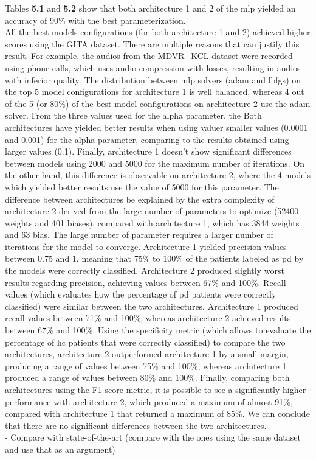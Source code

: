 Tables \textbf{5.1} and \textbf{5.2} show that both architecture 1 and 2 of the \gls{mlp} yielded an accuracy of 90\% with the best parameterization. \\
All the best models configurations (for both architecture 1 and 2) achieved higher scores using the GITA dataset. There are multiple reasons that can justify this result. For example, the audios from the MDVR\_KCL dataset were recorded using phone calls, which uses audio compression with losses, resulting in audios with inferior quality. The distribution between \gls{mlp} solvers (adam and lbfgs) on the top 5 model configurations for architecture 1 is well balanced, whereas 4 out of the 5 (or 80\%) of the best model configurations on architecture 2 use the adam solver. From the three values used for the alpha parameter, the Both architectures have yielded better results when using valuer smaller values (0.0001 and 0.001) for the alpha parameter, comparing to the results obtained using larger values (0.1). Finally, architecture 1 doesn't show significant differences between models using 2000 and 5000 for the maximum number of iterations. On the other hand, this difference is observable on architecture 2, where the 4 models which yielded better results use the value of 5000 for this parameter. The difference between architectures be explained by the extra complexity of architecture 2 derived from the large number of parameters to optimize (52400 weights and 401 biases), compared with architecture 1, which has 3844 weights and 63 bias. The large number of parameter requires a larger number of iterations for the model to converge.
Architecture 1 yielded precision values between 0.75 and 1, meaning that 75\% to 100\% of the patients labeled as \gls{pd} by the models were correctly classified. Architecture 2 produced slightly worst results regarding precision, achieving values between 67\% and 100\%. Recall values (which evaluates how the percentage of \gls{pd} patients were correctly classified) were similar between the two architectures. Architecture 1 produced recall values between 71\% and 100\%, whereas architecture 2 achieved results between 67\% and 100\%. Using the specificity metric (which allows to evaluate the percentage of \gls{hc} patients that were correctly classified) to compare the two architectures, architecture 2 outperformed architecture 1 by a small margin, producing a range of values between 75\% and 100\%, whereas architecture 1 produced a range of values between 80\% and 100\%. Finally, comparing both architectures using the F1-score metric, it is possible to see a significantly higher performance with architecture 2, which produced a maximum of almost 91\%, compared with architecture 1 that returned a maximum of 85\%.
We can conclude that there are no significant differences between the two architectures. \\
 - Compare with state-of-the-art (compare with the ones using the same dataset and use that as an argument)
 
